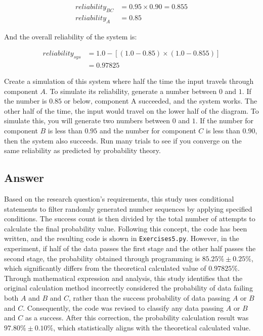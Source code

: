 \documentclass[a4paper, utf8]{ctexart}
\begin{document}
	\begin{equation}
		\begin{aligned}
			reliability_{BC}&=0.95\times0.90=0.855 \\
			reliability_A&=0.85
		\end{aligned}
		\nonumber
	\end{equation}
	
	And the overall reliability of the system is:
	
	\begin{equation}
		\begin{aligned}
			reliability_{sys}&=1.0-[(1.0-0.85)\times(1.0-0.855)] \\
			&=0.97825
		\end{aligned}
		\nonumber
	\end{equation}
	
	Create a simulation of this system where half the time the input travels through component $A$. To simulate its reliability, generate a number between $0$ and $1$. If the number is $0.85$ or below, component A succeeded, and the system works. The other half of the time, the input would travel on the lower half of the diagram. To simulate this, you will generate two numbers between $0$ and $1$. If the number for component $B$ is less than $0.95$ and the number for component $C$ is less than $0.90$, then the system also succeeds. Run many trials to see if you converge on the same reliability as predicted by probability theory.
	
	\subsection{Answer}
	
	Based on the research question's requirements, this study uses conditional statements to filter randomly generated number sequences by applying specified conditions. The success count is then divided by the total number of attempts to calculate the final probability value. Following this concept, the code has been written, and the resulting code is shown in \verb|Exercises5.py|. However, in the experiment, if half of the data passes the first stage and the other half passes the second stage, the probability obtained through programming is \(85.25\% \pm 0.25\%\), which significantly differs from the theoretical calculated value of \(0.97825\%\). Through mathematical expression and analysis, this study identifies that the original calculation method incorrectly considered the probability of data failing both $A$ and $B$ and $C$, rather than the success probability of data passing $A$ or $B$ and $C$. Consequently, the code was revised to classify any data passing $A$ or $B$ and $C$ as a success. After this correction, the probability calculation result was \(97.80\% \pm 0.10\%\), which statistically aligns with the theoretical calculated value.
	
\end{document}
